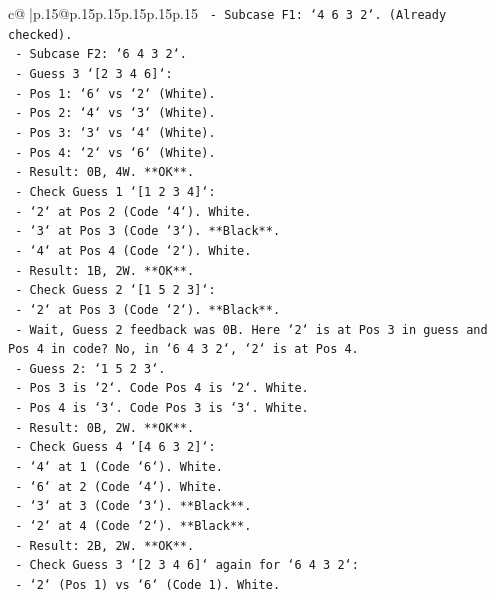 \documentclass{article}
\begin{document}
{\begin{supertabular}{c@{$\;$}|p{.15\linewidth}@{}p{.15\linewidth}p{.15\linewidth}p{.15\linewidth}p{.15\linewidth}p{.15\linewidth}}
{{{\texttt{  {-} Subcase F1: `4 6 3 2`. (Already checked).} \\
\texttt{  {-} Subcase F2: `6 4 3 2`.} \\
\texttt{    {-} Guess 3 `{[}2 3 4 6{]}`:} \\
\texttt{      {-} Pos 1: `6` vs `2` (White).} \\
\texttt{      {-} Pos 2: `4` vs `3` (White).} \\
\texttt{      {-} Pos 3: `3` vs `4` (White).} \\
\texttt{      {-} Pos 4: `2` vs `6` (White).} \\
\texttt{      {-} Result: 0B, 4W. **OK**.} \\
\texttt{    {-} Check Guess 1 `{[}1 2 3 4{]}`:} \\
\texttt{      {-} `2` at Pos 2 (Code `4`). White.} \\
\texttt{      {-} `3` at Pos 3 (Code `3`). **Black**.} \\
\texttt{      {-} `4` at Pos 4 (Code `2`). White.} \\
\texttt{      {-} Result: 1B, 2W. **OK**.} \\
\texttt{    {-} Check Guess 2 `{[}1 5 2 3{]}`:} \\
\texttt{      {-} `2` at Pos 3 (Code `2`). **Black**.} \\
\texttt{      {-} Wait, Guess 2 feedback was 0B. Here `2` is at Pos 3 in guess and Pos 4 in code? No, in `6 4 3 2`, `2` is at Pos 4.} \\
\texttt{      {-} Guess 2: `1 5 2 3`.} \\
\texttt{        {-} Pos 3 is `2`. Code Pos 4 is `2`. White.} \\
\texttt{        {-} Pos 4 is `3`. Code Pos 3 is `3`. White.} \\
\texttt{        {-} Result: 0B, 2W. **OK**.} \\
\texttt{    {-} Check Guess 4 `{[}4 6 3 2{]}`:} \\
\texttt{      {-} `4` at 1 (Code `6`). White.} \\
\texttt{      {-} `6` at 2 (Code `4`). White.} \\
\texttt{      {-} `3` at 3 (Code `3`). **Black**.} \\
\texttt{      {-} `2` at 4 (Code `2`). **Black**.} \\
\texttt{      {-} Result: 2B, 2W. **OK**.} \\
\texttt{    {-} Check Guess 3 `{[}2 3 4 6{]}` again for `6 4 3 2`:} \\
\texttt{      {-} `2` (Pos 1) vs `6` (Code 1). White.} \\
}}}
\end{supertabular}}
\end{document}
